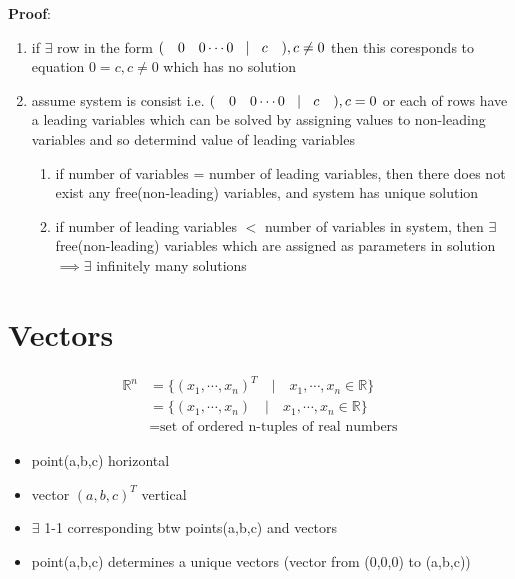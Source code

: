 \documentclass{article}
\theoremstyle{definition}
\theoremstyle{thrm}
\begin{document}
\textbf{Proof}:
\begin{enumerate}
	\item if $\exists$ row in the form $(\quad 0 \quad 0 \cdots 0 \quad \vline \quad c\quad ), c\neq 0$ then this coresponds to equation $0=c, c\neq 0$ which has no solution
	\item assume system is consist i.e. $(\quad 0 \quad 0 \cdots 0 \quad \vline \quad c\quad ), c =0$ or each of rows have a leading variables which can be solved by assigning values to non-leading variables and so determind value of leading variables
	\begin{enumerate}
		\item if number of variables  =  number of leading variables, then there does not exist any free(non-leading) variables, and system has unique solution
		\item if number of leading variables $<$ number of variables in system, then $\exists$ free(non-leading) variables which are assigned as parameters in solution $\implies \exists$ infinitely many solutions 
	\end{enumerate}
\end{enumerate}

\pagebreak
\section{Vectors}

\begin{align*}
	\mathbb{R}^n&= \{(x_1,\cdots,x_n)^T \quad |\quad x_1,\cdots ,x_n \in \mathbb{R} \}\\
	& = \{(x_1,\cdots,x_n) \quad|\quad x_1,\cdots ,x_n \in \mathbb{R} \}\\
	& =\text{set of ordered n-tuples of real numbers}
\end{align*}
\begin{itemize}
	\item point(a,b,c) horizontal
	\item vector $(a,b,c)^T$ vertical
	\item $\exists$ 1-1 corresponding btw points(a,b,c) and vectors 
	\item point(a,b,c) determines a unique vectors (vector from (0,0,0) to (a,b,c))
\end{itemize}
\end{document}
